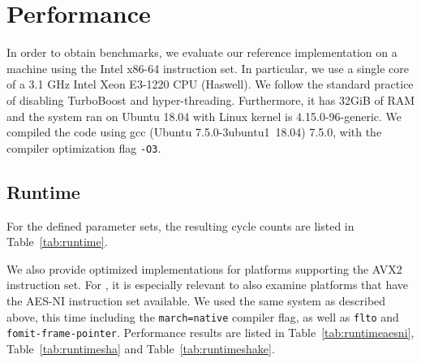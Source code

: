 \section{Performance}

In order to obtain benchmarks,
we evaluate our reference implementation on a machine using the Intel x86-64 instruction set.
In particular, we use a single core of a 3.1 GHz Intel Xeon E3-1220 CPU (Haswell).
We follow the standard practice of disabling TurboBoost and hyper-threading.
Furthermore, it has 32GiB of RAM and the system ran on Ubuntu 18.04 with Linux kernel is 4.15.0-96-generic.
We compiled the code using gcc (Ubuntu 7.5.0-3ubuntu1~18.04) 7.5.0, with the compiler optimization flag \texttt{-O3}.

\subsection{Runtime}

For the defined parameter sets, the resulting cycle counts are listed in Table~\ref{tab:runtime}.

We also provide optimized implementations for platforms supporting the AVX2 instruction set. For \haraka, it is especially relevant to also examine platforms that have the AES-NI instruction set available.
We used the same system as described above, this time including the \texttt{march=native} compiler flag, as well as \texttt{flto} and \texttt{fomit-frame-pointer}.
Performance results are listed in Table~\ref{tab:runtimeaesni}, Table~\ref{tab:runtimesha} and Table~\ref{tab:runtimeshake}.

